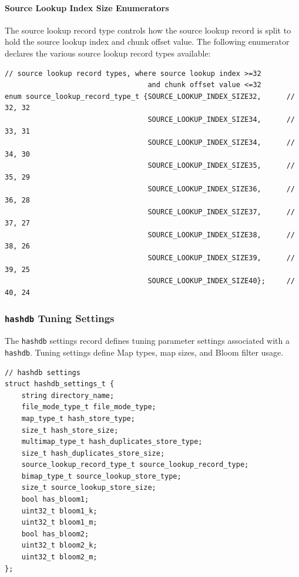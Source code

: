 \documentclass[10pt,twoside]{article}
\newcommand{\hdb}{\texttt{hashdb}\xspace}
\begin{document}
\paragraph{Source Lookup Index Size Enumerators}
The source lookup record type controls how the source lookup record
is split to hold the source lookup index and chunk offset value.
The following enumerator declares the various source lookup record types available:
\begin{small}
\begin{verbatim}
// source lookup record types, where source lookup index >=32
                                  and chunk offset value <=32
enum source_lookup_record_type_t {SOURCE_LOOKUP_INDEX_SIZE32,      // 32, 32
                                  SOURCE_LOOKUP_INDEX_SIZE34,      // 33, 31
                                  SOURCE_LOOKUP_INDEX_SIZE34,      // 34, 30
                                  SOURCE_LOOKUP_INDEX_SIZE35,      // 35, 29
                                  SOURCE_LOOKUP_INDEX_SIZE36,      // 36, 28
                                  SOURCE_LOOKUP_INDEX_SIZE37,      // 37, 27
                                  SOURCE_LOOKUP_INDEX_SIZE38,      // 38, 26
                                  SOURCE_LOOKUP_INDEX_SIZE39,      // 39, 25
                                  SOURCE_LOOKUP_INDEX_SIZE40};     // 40, 24
\end{verbatim}
\end{small}



\subsubsection{\hdb Tuning Settings}
The \hdb settings record defines tuning parameter settings
associated with a \hdb.
Tuning settings define Map types, map sizes, and Bloom filter usage.
\begin{small}
\begin{verbatim}
// hashdb settings
struct hashdb_settings_t {
    string directory_name;
    file_mode_type_t file_mode_type;
    map_type_t hash_store_type;
    size_t hash_store_size;
    multimap_type_t hash_duplicates_store_type;
    size_t hash_duplicates_store_size;
    source_lookup_record_type_t source_lookup_record_type;
    bimap_type_t source_lookup_store_type;
    size_t source_lookup_store_size;
    bool has_bloom1;
    uint32_t bloom1_k;
    uint32_t bloom1_m;
    bool has_bloom2;
    uint32_t bloom2_k;
    uint32_t bloom2_m;
};
\end{verbatim}
\end{small}
\end{document}
